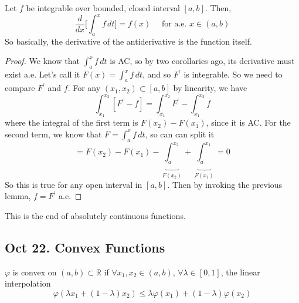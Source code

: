   \begin{corollary}
    Let $f$ be integrable over bounded, closed interval $[a, b]$. Then, 
    \begin{equation}
      \frac{d}{dx} \bigg[ \int_a^x f \,dt \bigg] = f(x) \quad \text{ for a.e. } x \in (a, b)
    \end{equation}
    So basically, the derivative of the antiderivative is the function itself. 
  \end{corollary}
  \begin{proof}
    We know that $\int_a^x f \,dt$ is AC, so by two corollaries ago, its derivative must exist a.e. Let's call it $F(x) = \int_a^x f \, dt$, and so $F^\prime$ is integrable. So we need to compare $F^\prime$ and $f$. For any $(x_1, x_2) \subset [a, b]$ by linearity, we have 
    \begin{equation}
      \int_{x_1}^{x_2} [ F^\prime - f ] = \int_{x_1}^{x_2} F^\prime - \int_{x_1}^{x_2} f 
    \end{equation}
    where the integral of the first term is $F(x_2) - F(x_1)$, since it is AC. For the second term, we know that $F = \int_a^x f \,dt$, so can can split it 
    \begin{equation}
      = F(x_2) - F(x_1) - \underbrace{\int_a^{x_2}}_{F(x_2)} + \underbrace{\int_{a}^{x_1}}_{F(x_1)} = 0
    \end{equation}
    So this is true for any open interval in $[a, b]$. Then by invoking the previous lemma, $f = F^\prime$ a.e. 
  \end{proof}

  This is the end of absolutely continuous functions. 

\subsection{Oct 22. Convex Functions} 

  \begin{definition}
    $\varphi$ is convex on $(a, b) \subset \mathbb{R}$ if $\forall x_1, x_2 \in (a, b)$, $\forall \lambda \in [0, 1]$, the linear interpolation 
    \begin{equation}
      \varphi (\lambda x_1 + (1 - \lambda) x_2) \leq \lambda \varphi(x_1) + (1 - \lambda) \varphi(x_2)
    \end{equation}
  \end{definition}

